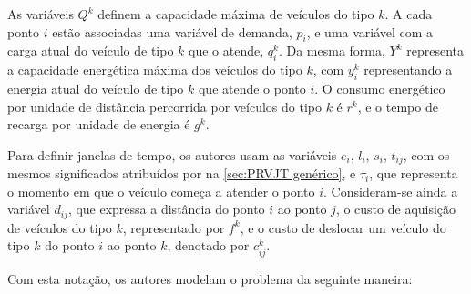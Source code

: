 As variáveis $Q^k$ definem a capacidade máxima de veículos do tipo $k$. A cada ponto $i$ estão associadas uma variável de demanda, $p_i$, e uma variável com a carga atual do veículo de tipo $k$ que o atende, $q_i^k$. Da mesma forma, $Y^k$ representa a capacidade energética máxima dos veículos do tipo $k$, com $y_i^k$ representando a energia atual do veículo de tipo $k$ que atende o ponto $i$. O consumo energético por unidade de distância percorrida por veículos do tipo $k$ é $r^k$, e o tempo de recarga por unidade de energia é $g^k$.

Para definir janelas de tempo, os autores usam as variáveis $e_i$, $l_i$, $s_i$, $t_{ij}$, com os mesmos significados atribuídos por \textcite{VIEIRA:13} na \cref{sec:PRVJT genérico}, e $\tau_i$, que representa o momento em que o veículo começa a atender o ponto $i$. Consideram-se ainda a variável $d_{ij}$, que expressa a distância do ponto $i$ ao ponto $j$, o custo de aquisição de veículos do tipo $k$, representado por $f^k$, e o custo de deslocar um veículo do tipo $k$ do ponto $i$ ao ponto $k$, denotado por $c_{ij}^k$.

Com esta notação, os autores modelam o problema da seguinte maneira:

